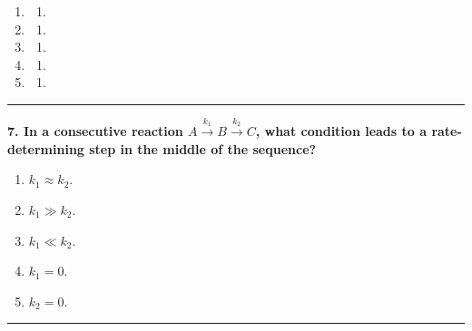 \documentclass[
  9pt,
]{extbook}
\providecommand{\tightlist}{%
  \setlength{\itemsep}{0pt}\setlength{\parskip}{0pt}}
\theoremstyle{definition}
\theoremstyle{definition}
\theoremstyle{definition}
\theoremstyle{definition}
\theoremstyle{remark}
\begin{document}
\begin{enumerate}
\def\labelenumi{\alph{enumi}.}
\tightlist
\item
  \begin{enumerate}
  \def\labelenumii{\arabic{enumii}.}
  \setcounter{enumii}{2}
  \tightlist
  \item
  \end{enumerate}
\item
  \begin{enumerate}
  \def\labelenumii{\arabic{enumii}.}
  \setcounter{enumii}{1}
  \tightlist
  \item
  \end{enumerate}
\item
  \begin{enumerate}
  \def\labelenumii{\arabic{enumii}.}
  \tightlist
  \item
  \end{enumerate}
\item
  \begin{enumerate}
  \def\labelenumii{\arabic{enumii}.}
  \setcounter{enumii}{-1}
  \tightlist
  \item
  \end{enumerate}
\item
  \begin{enumerate}
  \def\labelenumii{\arabic{enumii}.}
  \setcounter{enumii}{3}
  \tightlist
  \item
  \end{enumerate}
\end{enumerate}

\begin{center}\rule{0.5\linewidth}{0.5pt}\end{center}

\textbf{7. In a consecutive reaction \(A \xrightarrow{k_1} B \xrightarrow{k_2} C\), what condition leads to a rate-determining step in the middle of the sequence?}

\begin{enumerate}
\def\labelenumi{\alph{enumi}.}
\tightlist
\item
  \(k_1 \approx k_2\).
\item
  \(k_1 \gg k_2\).
\item
  \(k_1 \ll k_2\).
\item
  \(k_1 = 0\).
\item
  \(k_2 = 0\).
\end{enumerate}

\begin{center}\rule{0.5\linewidth}{0.5pt}\end{center}
\end{document}

